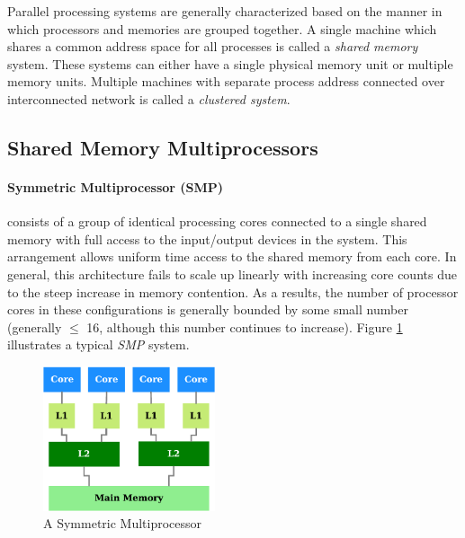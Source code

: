\documentclass[11pt]{book}
\begin{document}
Parallel processing systems \cite{culler-97,patterson-11} are generally characterized based on the manner
in which processors and memories are grouped together.  A single machine which shares a common address
space for all processes is called a \emph{shared memory} system.  These systems can either have a single
physical memory unit or multiple memory units.  Multiple machines with separate process address connected
over interconnected network is called a \emph{clustered system}.

\subsection{Shared Memory Multiprocessors}\label{subsec:shared_memory_multiprocessors}

\paragraph{Symmetric Multiprocessor (SMP)} consists of a group of identical processing cores connected to a
single shared memory with full access to the input/output devices in the system.  This arrangement allows
uniform time access to the shared memory from each core.  In general, this architecture fails to scale up
linearly with increasing core counts due to the steep increase in memory contention.  As a results, the number
of processor cores in these configurations is generally bounded by some small number (generally $\leq$ 16,
although this number continues to increase).  Figure \ref{fig:smp} illustrates a typical \emph{SMP} system.

\begin{figure}
    \centering
    \includegraphics[width=0.45\textwidth]{figures/smp.pdf}
    \caption{A Symmetric Multiprocessor}\label{fig:smp}
\end{figure}
\end{document}
